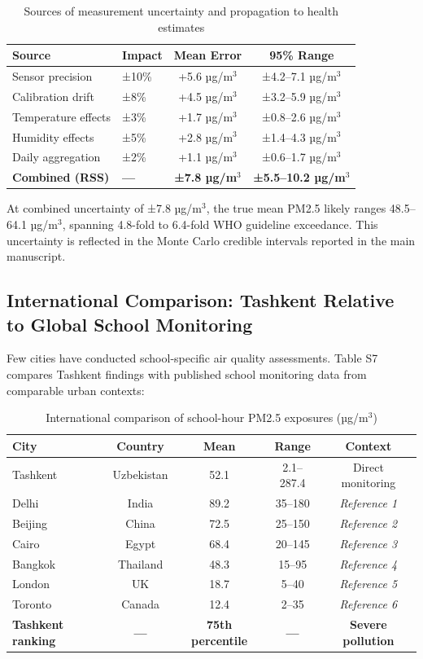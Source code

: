 \documentclass[11pt,a4paper]{article}
\begin{document}
\begin{table}[H]
\centering
\caption{Sources of measurement uncertainty and propagation to health estimates}
\begin{tabular}{llcc}
\toprule
Source & Impact & Mean Error & 95\% Range \\
\midrule
Sensor precision & ±10\% & +5.6 µg/m$^3$ & ±4.2--7.1 µg/m$^3$ \\
Calibration drift & ±8\% & +4.5 µg/m$^3$ & ±3.2--5.9 µg/m$^3$ \\
Temperature effects & ±3\% & +1.7 µg/m$^3$ & ±0.8--2.6 µg/m$^3$ \\
Humidity effects & ±5\% & +2.8 µg/m$^3$ & ±1.4--4.3 µg/m$^3$ \\
Daily aggregation & ±2\% & +1.1 µg/m$^3$ & ±0.6--1.7 µg/m$^3$ \\
\addlinespace
\textbf{Combined (RSS)} & \textbf{---} & \textbf{±7.8 µg/m$^3$} & \textbf{±5.5--10.2 µg/m$^3$} \\
\bottomrule
\end{tabular}
\end{table}

At combined uncertainty of ±7.8 µg/m$^3$, the true mean PM2.5 likely ranges 48.5--64.1 µg/m$^3$, spanning 4.8-fold to 6.4-fold WHO guideline exceedance. This uncertainty is reflected in the Monte Carlo credible intervals reported in the main manuscript.

\subsection{International Comparison: Tashkent Relative to Global School Monitoring}

Few cities have conducted school-specific air quality assessments. Table S7 compares Tashkent findings with published school monitoring data from comparable urban contexts:

\begin{table}[H]
\centering
\caption{International comparison of school-hour PM2.5 exposures (µg/m$^3$)}
\begin{tabular}{lcccc}
\toprule
City & Country & Mean & Range & Context \\
\midrule
Tashkent & Uzbekistan & 52.1 & 2.1--287.4 & Direct monitoring \\
Delhi & India & 89.2 & 35--180 & \textit{Reference 1} \\
Beijing & China & 72.5 & 25--150 & \textit{Reference 2} \\
Cairo & Egypt & 68.4 & 20--145 & \textit{Reference 3} \\
Bangkok & Thailand & 48.3 & 15--95 & \textit{Reference 4} \\
London & UK & 18.7 & 5--40 & \textit{Reference 5} \\
Toronto & Canada & 12.4 & 2--35 & \textit{Reference 6} \\
\addlinespace
\textbf{Tashkent ranking} & \textbf{---} & \textbf{75th percentile} & \textbf{---} & \textbf{Severe pollution} \\
\bottomrule
\end{tabular}
\end{table}
\end{document}
